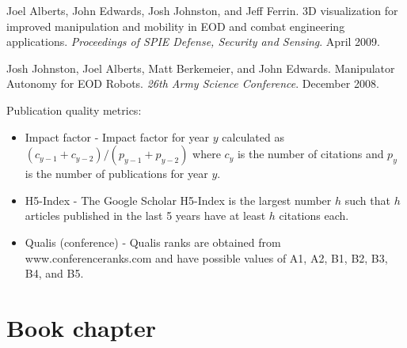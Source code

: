 \documentclass[margin,line]{res}
\newcommand{\pubunder}[1]{#1}
\newcommand{\pnum}[1]{}
\newenvironment{tightitemize}{
\begin{itemize}
  \setlength{\itemsep}{1pt}
  \setlength{\parskip}{0pt}
  \setlength{\parsep}{0pt}
}{\end{itemize}
}
\begin{document}
\begin{resume}
\pnum{2} Joel Alberts, \pubunder{John Edwards}, Josh Johnston, and Jeff Ferrin. 3D visualization for improved manipulation and mobility in EOD and combat engineering applications. \textit{Proceedings of SPIE Defense, Security and Sensing}. April 2009.

\pnum{1} Josh Johnston, Joel Alberts, Matt Berkemeier, and \pubunder{John Edwards}. Manipulator Autonomy for EOD Robots. \textit{26th Army Science Conference}. December 2008.

\begin{IMPACT}
\end{IMPACT}

Publication quality metrics:
\begin{tightitemize}
\item Impact factor - Impact factor for year $y$ calculated as $(c_{y-1}+c_{y-2})/(p_{y-1}+p_{y-2})$ where $c_y$ is the number of citations and $p_y$ is the number of publications for year $y$.
\item H5-Index - The Google Scholar H5-Index is the largest number $h$ such that $h$ articles published in the last 5 years have at least $h$ citations each.
\item Qualis (conference) - Qualis ranks are obtained from www.conferenceranks.com and have possible values of A1, A2, B1, B2, B3, B4, and B5.
\end{tightitemize}






\section{\sc Book chapter}


\end{resume}
\end{document}
